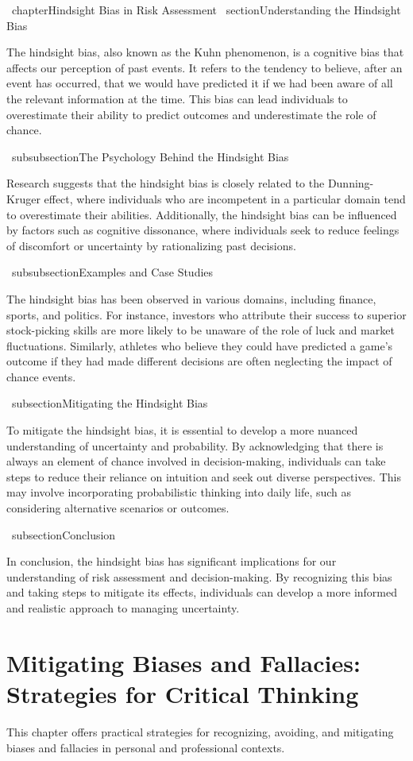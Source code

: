 \documentclass{report}%
\begin{document}
{{{{{{{{{{{%
\ chapter{Hindsight Bias in Risk Assessment}
\ section{Understanding the Hindsight Bias}

The hindsight bias, also known as the Kuhn phenomenon, is a cognitive bias that affects our perception of past events. It refers to the tendency to believe, after an event has occurred, that we would have predicted it if we had been aware of all the relevant information at the time. This bias can lead individuals to overestimate their ability to predict outcomes and underestimate the role of chance.

\ subsubsection{The Psychology Behind the Hindsight Bias}

Research suggests that the hindsight bias is closely related to the Dunning-Kruger effect, where individuals who are incompetent in a particular domain tend to overestimate their abilities. Additionally, the hindsight bias can be influenced by factors such as cognitive dissonance, where individuals seek to reduce feelings of discomfort or uncertainty by rationalizing past decisions.

\ subsubsection{Examples and Case Studies}

The hindsight bias has been observed in various domains, including finance, sports, and politics. For instance, investors who attribute their success to superior stock-picking skills are more likely to be unaware of the role of luck and market fluctuations. Similarly, athletes who believe they could have predicted a game's outcome if they had made different decisions are often neglecting the impact of chance events.

\ subsection{Mitigating the Hindsight Bias}

To mitigate the hindsight bias, it is essential to develop a more nuanced understanding of uncertainty and probability. By acknowledging that there is always an element of chance involved in decision-making, individuals can take steps to reduce their reliance on intuition and seek out diverse perspectives. This may involve incorporating probabilistic thinking into daily life, such as considering alternative scenarios or outcomes.

\ subsection{Conclusion}

In conclusion, the hindsight bias has significant implications for our understanding of risk assessment and decision-making. By recognizing this bias and taking steps to mitigate its effects, individuals can develop a more informed and realistic approach to managing uncertainty.%
\chapter{Mitigating Biases and Fallacies: Strategies for Critical Thinking}%
This chapter offers practical strategies for recognizing, avoiding, and mitigating biases and fallacies in personal and professional contexts.

}}}}}}}}}}}
\end{document}
